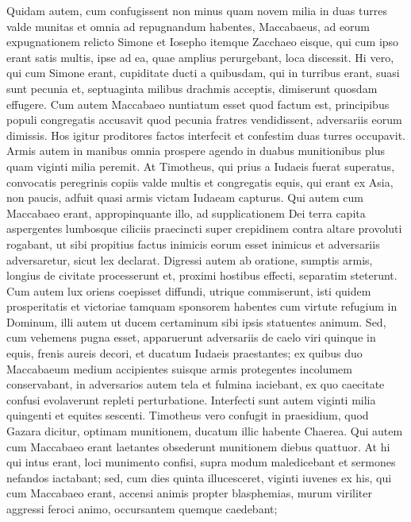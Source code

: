 \begin{biblechapter}
\begin{biblechapter}
\begin{biblechapter}
\begin{biblechapter}
\begin{biblechapter}
\begin{biblechapter}
\begin{biblechapter}
\begin{biblechapter}
\begin{biblechapter}
\begin{biblechapter}
\verse Quidam autem, cum confugissent non minus quam novem milia in duas turres valde munitas et omnia ad repugnandum habentes, 
 \verse Maccabaeus, ad eorum expugnationem relicto Simone et Iosepho itemque Zacchaeo eisque, qui cum ipso erant satis multis, ipse ad ea, quae amplius perurgebant, loca discessit. 
\verse Hi vero, qui cum Simone erant, cupiditate ducti a quibusdam, qui in turribus erant, suasi sunt pecunia et, septuaginta milibus drachmis acceptis, dimiserunt quosdam effugere. 
\verse Cum autem Maccabaeo nuntiatum esset quod factum est, principibus populi congregatis accusavit quod pecunia fratres vendidissent, adversariis eorum dimissis. 
\verse Hos igitur proditores factos interfecit et confestim duas turres occupavit. 
\verse Armis autem in manibus omnia prospere agendo in duabus munitionibus plus quam viginti milia peremit.
 \verse At Timotheus, qui prius a Iudaeis fuerat superatus, convocatis peregrinis copiis valde multis et congregatis equis, qui erant ex Asia, non paucis, adfuit quasi armis victam Iudaeam capturus. 
\verse Qui autem cum Maccabaeo erant, appropinquante illo, ad supplicationem Dei terra capita aspergentes lumbosque ciliciis praecincti 
\verse super crepidinem contra altare provoluti rogabant, ut sibi propitius factus inimicis eorum esset inimicus et adversariis adversaretur, sicut lex declarat. 
\verse Digressi autem ab oratione, sumptis armis, longius de civitate processerunt et, proximi hostibus effecti, separatim steterunt. 
\verse Cum autem lux oriens coepisset diffundi, utrique commiserunt, isti quidem prosperitatis et victoriae tamquam sponsorem habentes cum virtute refugium in Dominum, illi autem ut ducem certaminum sibi ipsis statuentes animum. 
\verse Sed, cum vehemens pugna esset, apparuerunt adversariis de caelo viri quinque in equis, frenis aureis decori, et ducatum Iudaeis praestantes; 
\verse ex quibus duo Maccabaeum medium accipientes suisque armis protegentes incolumem conservabant, in adversarios autem tela et fulmina iaciebant, ex quo caecitate confusi evolaverunt repleti perturbatione. 
\verse Interfecti sunt autem viginti milia quingenti et equites sescenti.
 \verse Timotheus vero confugit in praesidium, quod Gazara dicitur, optimam munitionem, ducatum illic habente Chaerea. 
\verse Qui autem cum Maccabaeo erant laetantes obsederunt munitionem diebus quattuor. 
\verse At hi qui intus erant, loci munimento confisi, supra modum maledicebant et sermones nefandos iactabant; 
 \verse sed, cum dies quinta illucesceret, viginti iuvenes ex his, qui cum Maccabaeo erant, accensi animis propter blasphemias, murum viriliter aggressi feroci animo, occursantem quemque caedebant; 

\end{biblechapter}
\end{biblechapter}
\end{biblechapter}
\end{biblechapter}
\end{biblechapter}
\end{biblechapter}
\end{biblechapter}
\end{biblechapter}
\end{biblechapter}
\end{biblechapter}
